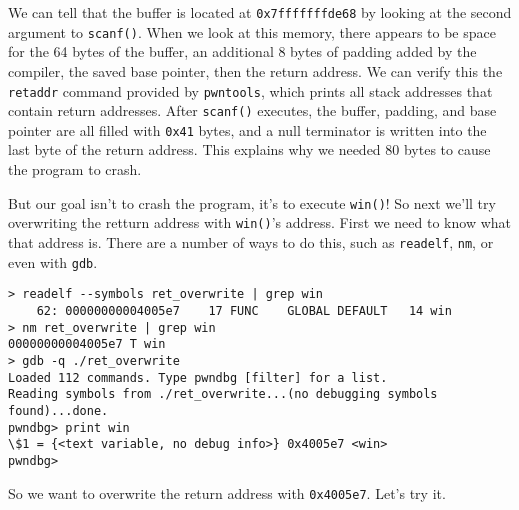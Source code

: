 We can tell that the buffer is located at \texttt{0x7fffffffde68} by looking at
the second argument to \texttt{scanf()}. When we look at this memory, there
appears to be space for the 64 bytes of the buffer, an additional 8 bytes of
padding added by the compiler, the saved base pointer, then the return address.
We can verify this the \texttt{retaddr} command provided by \texttt{pwntools},
which prints all stack addresses that contain return addresses. After
\texttt{scanf()} executes, the buffer, padding, and base pointer are all filled
with \texttt{0x41} bytes, and a null terminator is written into the last byte of
the return address. This explains why we needed 80 bytes to cause the program to
crash.

But our goal isn't to crash the program, it's to execute \texttt{win()}! So next
we'll try overwriting the retturn address with \texttt{win()}'s address. First
we need to know what that address is. There are a number of ways to do this,
such as \texttt{readelf}, \texttt{nm}, or even with \texttt{gdb}.

\begin{lstlisting}
> readelf --symbols ret_overwrite | grep win
    62: 00000000004005e7    17 FUNC    GLOBAL DEFAULT   14 win
> nm ret_overwrite | grep win
00000000004005e7 T win
> gdb -q ./ret_overwrite
Loaded 112 commands. Type pwndbg [filter] for a list.
Reading symbols from ./ret_overwrite...(no debugging symbols found)...done.
pwndbg> print win
\$1 = {<text variable, no debug info>} 0x4005e7 <win>
pwndbg> 
\end{lstlisting}

So we want to overwrite the return address with \texttt{0x4005e7}. Let's try it.


